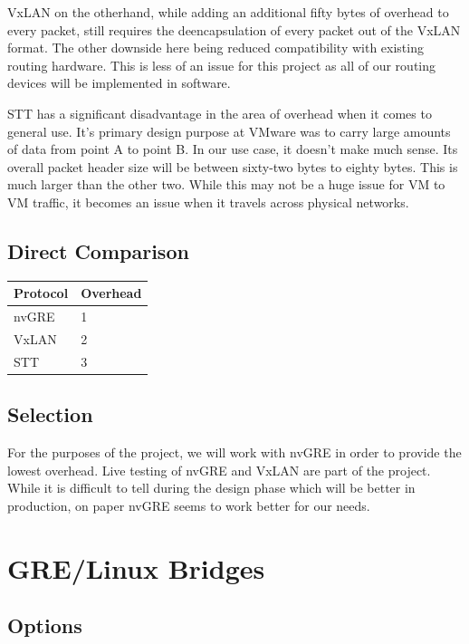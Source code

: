 \documentclass[10pt,letterpaper,onecolumn,draftclsnofoot]{IEEEtran}
\begin{document}
VxLAN on the otherhand, while adding an additional fifty bytes of overhead to
every packet, still requires the deencapsulation of every packet out of
the VxLAN format. The other downside here being reduced compatibility with
existing routing hardware. This is less of an issue for this project as all of
our routing devices will be implemented in software.\cite{nvgre-vs-vxlan}

STT has a significant disadvantage in the area of overhead when it comes to
general use. It's primary design purpose at VMware was to carry large amounts of
data from point A to point B. In our use case, it doesn't make much sense. Its
overall packet header size will be between sixty-two bytes to eighty bytes. This
is much larger than the other two. While this may not be a huge issue for VM to
VM traffic, it becomes an issue when it travels across physical networks.
\cite{stt}

\subsection{Direct Comparison}
\begin{center}
	\begin{tabular}{| l | l |}
		\hline
		Protocol & Overhead \\ \hline
		nvGRE & 1 \\ \hline
		VxLAN & 2 \\ \hline
		STT & 3 \\ \hline
	\end{tabular}
\end{center}

\subsection{Selection}
For the purposes of the project, we will work with nvGRE in order to provide the
lowest overhead. Live testing of nvGRE and VxLAN are part of the project. While
it is difficult to tell during the design phase which will be better in
production, on paper nvGRE seems to work better for our needs.


\section{GRE/Linux Bridges}

\subsection{Options}
\end{document}
